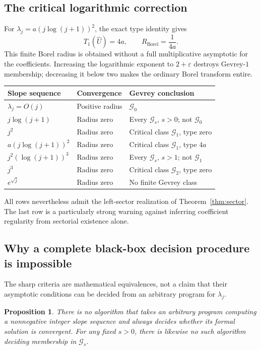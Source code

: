 \documentclass[11pt,a4paper]{article}
\numberwithin{equation}{section}
\newtheorem{proposition}[theorem]{Proposition}
\theoremstyle{definition}
\theoremstyle{remark}
\newcommand{\Gev}{\mathcal G}
\newcommand{\Uhat}{\widehat U}
\begin{document}
\subsection{The critical logarithmic correction}
For $\lambda_j=a(j\log(j+1))^2$, the exact type identity gives
\[
 T_1(\Uhat)=4a,
 \qquad R_{\mathrm{Borel}}=\frac1{4a}.
\]
This finite Borel radius is obtained without a full multiplicative
asymptotic for the coefficients.  Increasing the logarithmic exponent to
$2+\varepsilon$ destroys Gevrey-$1$ membership; decreasing it below two
makes the ordinary Borel transform entire.

\begin{center}
\small
\begin{tabular}{@{}p{}p{}p{}@{}}
\toprule
Slope sequence & Convergence & Gevrey conclusion\\
\midrule
$\lambda_j=O(j)$ & Positive radius & $\Gev_0$\\
$j\log(j+1)$ & Radius zero & Every $\Gev_s$, $s>0$; not $\Gev_0$\\
$j^2$ & Radius zero & Critical class $\Gev_1$, type zero\\
$a(j\log(j+1))^2$ & Radius zero & Critical class $\Gev_1$, type $4a$\\
$j^2(\log(j+1))^3$ & Radius zero & Every $\Gev_s$, $s>1$; not $\Gev_1$\\
$j^3$ & Radius zero & Critical class $\Gev_2$, type zero\\
$e^{\sqrt j}$ & Radius zero & No finite Gevrey class\\
\bottomrule
\end{tabular}
\end{center}
All rows nevertheless admit the left-sector realization of
Theorem~\ref{thm:sector}.  The last row is a particularly strong warning
against inferring coefficient regularity from sectorial existence alone.

\subsection{Why a complete black-box decision procedure is impossible}
The sharp criteria are mathematical equivalences, not a claim that their
asymptotic conditions can be decided from an arbitrary program for
$\lambda_j$.

\begin{proposition}
\label{prop:undecidable}
There is no algorithm that takes an arbitrary program computing a
nonnegative integer slope sequence and always decides whether its formal
solution is convergent.  For any fixed $s>0$, there is likewise no such
algorithm deciding membership in $\Gev_s$.
\end{proposition}
\end{document}
